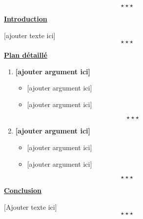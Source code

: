 \newpage \begin{center}
	\subsubsection*{}
\end{center}
$$\star \star \star$$

\begin{center}
	\textbf{\underline{Introduction}} 
\end{center}

[ajouter texte ici] $$\star \star \star$$

\begin{center}
	{\bfseries \underline{Plan détaillé}}	
\end{center}
\begin{enumerate}[label*=$\longrightarrow$]
	\item \textbf{[ajouter argument ici]}
	\begin{itemize}
		\item {[ajouter argument ici]}
		\item {[ajouter argument ici]}
	\end{itemize}
	$$\star \star \star$$
	\item \textbf{[ajouter argument ici]}
	\begin{itemize}
		\item {[ajouter argument ici]}
		\item {[ajouter argument ici]} 
	\end{itemize}
\end{enumerate}
$$\star \star \star$$
\begin{center}
	\textbf{\underline{Conclusion}} 
\end{center} 

[Ajouter texte ici] $$\star \star \star$$

